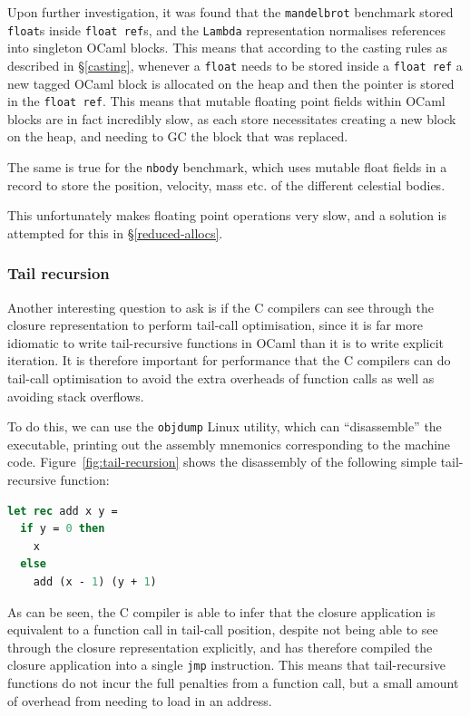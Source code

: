 Upon further investigation, it was found that the \texttt{mandelbrot} benchmark
stored \texttt{float}s inside \texttt{float ref}s, and the \texttt{Lambda}
representation normalises references into singleton OCaml blocks. This means
that according to the casting rules as described in \S\ref{casting}, whenever a
\texttt{float} needs to be stored inside a \texttt{float ref} a new tagged OCaml
block is allocated on the heap and then the pointer is stored in the
\texttt{float ref}. This means that mutable floating point fields within OCaml
blocks are in fact incredibly slow, as each store necessitates creating a new
block on the heap, and needing to GC the block that was replaced.

The same is true for the \texttt{nbody} benchmark, which uses mutable float 
fields in a record to store the position, velocity, mass etc. of the different 
celestial bodies.

This unfortunately makes floating point operations very slow, and a solution is
attempted for this in \S\ref{reduced-allocs}.

\subsubsection{Tail recursion}\label{tail-recursion}

Another interesting question to ask is if the C compilers can see through the 
closure representation to perform tail-call optimisation, since it is far more 
idiomatic to write tail-recursive functions in OCaml than it is to write 
explicit iteration. It is therefore important for performance that the C 
compilers can do tail-call optimisation to avoid the extra overheads of 
function calls as well as avoiding stack overflows.

To do this, we can use the \texttt{objdump} Linux utility, which can 
``disassemble'' the executable, printing out the assembly mnemonics 
corresponding to the machine code.  Figure~\ref{fig:tail-recursion} shows the 
disassembly of the following simple tail-recursive function:

\begin{lstlisting}[language=Caml]
let rec add x y =
  if y = 0 then
    x
  else
    add (x - 1) (y + 1)
\end{lstlisting}

As can be seen, the C compiler is able to infer that the closure application is 
equivalent to a function call in tail-call position, despite not being able to 
see through the closure representation explicitly, and has therefore compiled 
the closure application into a single \texttt{jmp} instruction. This means that 
tail-recursive functions do not incur the full penalties from a function call, 
but a small amount of overhead from needing to load in an address.


